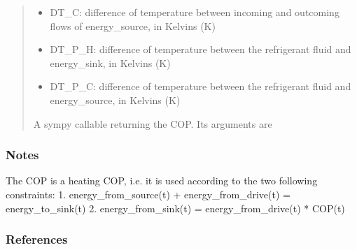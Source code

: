 \documentclass[letterpaper,10pt,english]{sphinxmanual}
\begin{document}
\begin{fulllineitems}
\begin{fulllineitems}
\begin{quote}
\begin{description}
\begin{itemize}
\item {} 
\sphinxAtStartPar
DT\_C: difference of temperature between incoming and outcoming flows of energy\_source, in Kelvins (K)

\item {} 
\sphinxAtStartPar
DT\_P\_H: difference of temperature between the refrigerant fluid and energy\_sink, in Kelvins (K)

\item {} 
\sphinxAtStartPar
DT\_P\_C: difference of temperature between the refrigerant fluid and energy\_source, in Kelvins (K)

\end{itemize}


\sphinxAtStartPar
A sympy callable returning the COP. Its arguments are

\end{description}\end{quote}
\subsubsection*{Notes}

\sphinxAtStartPar
The COP is a heating COP, i.e. it is used according to the two following constraints:
1. energy\_from\_source(t) + energy\_from\_drive(t) = energy\_to\_sink(t)
2. energy\_from\_sink(t) = energy\_from\_drive(t) * COP(t)
\subsubsection*{References}

\end{fulllineitems}



\end{fulllineitems}
\end{document}

